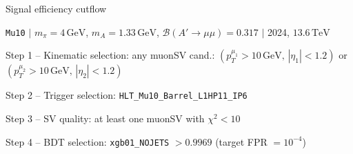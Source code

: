\documentclass[10pt,a4paper]{article}
\begin{document}
{\large Signal efficiency cutflow

 \texttt{Mu10} $|$ $m_{\pi}=4\,\mathrm{GeV}$, $m_{A}=1.33\,\mathrm{GeV}$, $\mathcal{B}(A'\!\to\!\mu\mu)=0.317$ $|$ 2024, $13.6\,\mathrm{TeV}$}

\vspace{0.8em}

Step 1 -- Kinematic selection: any muonSV cand.: $(p_T^{\mu_1}{>}10\,\mathrm{GeV},\,|\eta_1|{<}1.2)$ or $(p_T^{\mu_2}{>}10\,\mathrm{GeV},\,|\eta_2|{<}1.2)$

Step 2 -- Trigger selection: \texttt{HLT\_Mu10\_Barrel\_L1HP11\_IP6}

Step 3 -- SV quality: at least one muonSV with $\chi^2<10$

Step 4 -- BDT selection: \texttt{xgb01\_NOJETS} $>0.9969$ (target FPR $=10^{-4}$)

\vspace{0.8em}
\end{document}
